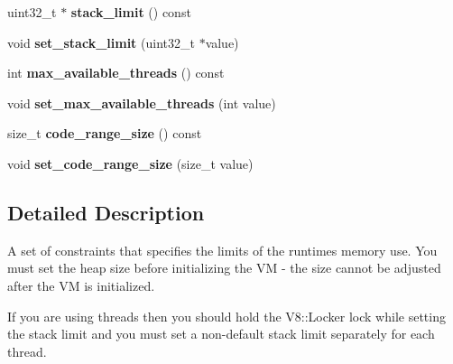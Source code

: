 \begin{DoxyCompactItemize}
\item 
\hypertarget{classv8_1_1ResourceConstraints_aafc4a94f2eeb0684e7a50f355eb4d06d}{}uint32\+\_\+t $\ast$ {\bfseries stack\+\_\+limit} () const \label{classv8_1_1ResourceConstraints_aafc4a94f2eeb0684e7a50f355eb4d06d}

\item 
\hypertarget{classv8_1_1ResourceConstraints_a26ed3e89985a4afe34e84509fb093cf1}{}void {\bfseries set\+\_\+stack\+\_\+limit} (uint32\+\_\+t $\ast$value)\label{classv8_1_1ResourceConstraints_a26ed3e89985a4afe34e84509fb093cf1}

\item 
\hypertarget{classv8_1_1ResourceConstraints_a27a36f0bacb800468d3574f738d12436}{}int {\bfseries max\+\_\+available\+\_\+threads} () const \label{classv8_1_1ResourceConstraints_a27a36f0bacb800468d3574f738d12436}

\item 
\hypertarget{classv8_1_1ResourceConstraints_a1bec2735c94ff50bfbd54bd70f004b72}{}void {\bfseries set\+\_\+max\+\_\+available\+\_\+threads} (int value)\label{classv8_1_1ResourceConstraints_a1bec2735c94ff50bfbd54bd70f004b72}

\item 
\hypertarget{classv8_1_1ResourceConstraints_a8dd511917ad17bf2185d574b0c7e4186}{}size\+\_\+t {\bfseries code\+\_\+range\+\_\+size} () const \label{classv8_1_1ResourceConstraints_a8dd511917ad17bf2185d574b0c7e4186}

\item 
\hypertarget{classv8_1_1ResourceConstraints_af887bf453b41b79eb174e5eeee0f1db2}{}void {\bfseries set\+\_\+code\+\_\+range\+\_\+size} (size\+\_\+t value)\label{classv8_1_1ResourceConstraints_af887bf453b41b79eb174e5eeee0f1db2}

\end{DoxyCompactItemize}


\subsection{Detailed Description}
A set of constraints that specifies the limits of the runtime\textquotesingle{}s memory use. You must set the heap size before initializing the V\+M -\/ the size cannot be adjusted after the V\+M is initialized.

If you are using threads then you should hold the V8\+::\+Locker lock while setting the stack limit and you must set a non-\/default stack limit separately for each thread. 

